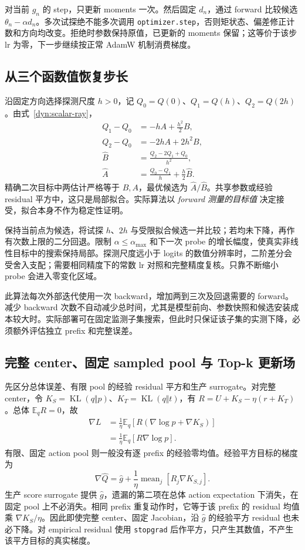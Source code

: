 \documentclass[lang=cn,scheme=chinese,openany]{../book/elegantbook}
\newcommand{\E}{\mathbb E}
\newcommand{\KL}{\operatorname{KL}}
\begin{document}
对当前 $g_n$ 的 step，只更新 moments 一次。然后固定 $d_n$，通过 forward 比较候选 $\theta_n-\alpha d_n$。多次试探绝不能多次调用 \texttt{optimizer.step}，否则矩状态、偏差修正计数和方向均改变。拒绝时参数保持原值，已更新的 moments 保留；这等价于该步 lr 为零，下一步继续按正常 AdamW 机制消费梯度。

\subsection{从三个函数值恢复步长}

沿固定方向选择探测尺度 $h>0$，记 $Q_0=Q(0)$、$Q_1=Q(h)$、$Q_2=Q(2h)$。由式~\eqref{dyn:scalar-ray}，
\begin{align}
Q_1-Q_0&=-hA+\frac{h^2}2B,\\
Q_2-Q_0&=-2hA+2h^2B,\\
\widehat B&=\frac{Q_2-2Q_1+Q_0}{h^2},\\
\widehat A&=\frac{Q_0-Q_1}{h}+\frac h2\widehat B.
\end{align}
精确二次目标中两估计严格等于 $B,A$，最优候选为 $\widehat A/\widehat B$。共享参数或经验 residual 平方中，这只是局部拟合。实际算法以 \emph{forward 测量的目标值} 决定接受，拟合本身不作为稳定性证明。

保持当前点为候选，将试探 $h$、$2h$ 与受限拟合候选一并比较；若均未下降，再作有次数上限的二分回退。限制 $\alpha\le\alpha_{\max}$ 和下一次 probe 的增长幅度，使真实非线性目标中的搜索保持局部。探测尺度远小于 logits 的数值分辨率时，二阶差分会受舍入支配；需要相同精度下的常数 lr 对照和完整精度复核。只靠不断缩小 probe 会进入零变化区域。

此算法每次外部迭代使用一次 backward，增加两到三次及回退需要的 forward。减少 backward 次数不自动减少总时间，尤其是模型前向、参数快照和候选安装成本较大时。实际部署可在固定监测子集搜索，但此时只保证该子集的实测下降，必须额外评估独立 prefix 和完整误差。

\subsection{完整 center、固定 sampled pool 与 Top-k 更新场}

先区分总体误差、有限 pool 的经验 residual 平方和生产 surrogate。对完整 center，令 $K_S=\KL(q\Vert p)$、$K_T=\KL(q\Vert t)$，有 $R=U+K_S-\eta(r+K_T)$。总体 $\E_q R=0$，故
\begin{align}
\nabla L
&=\frac1\eta\E_q[R(\nabla\log p+\nabla K_S)]\\
&=\frac1\eta\E_q[R\nabla\log p].
\end{align}
有限、固定 action pool 则一般没有逐 prefix 的经验零均值。经验平方目标的梯度为
\begin{equation}
\nabla\widehat Q=\widehat g+
\frac1\eta\operatorname{mean}_j[R_j\nabla K_{S,j}].
\end{equation}
生产 score surrogate 提供 $\widehat g$，遗漏的第二项在总体 action expectation 下消失，在固定 pool 上不必消失。相同 prefix 重复动作时，它等于该 prefix 的 residual 均值乘 $\nabla K_S/\eta$。因此即使完整 center、固定 Jacobian，沿 $\widehat g$ 的经验平方 residual 也未必下降。对 empirical residual 使用 \texttt{stopgrad} 后作平方，只产生其数值，不产生该平方目标的真实梯度。
\end{document}
